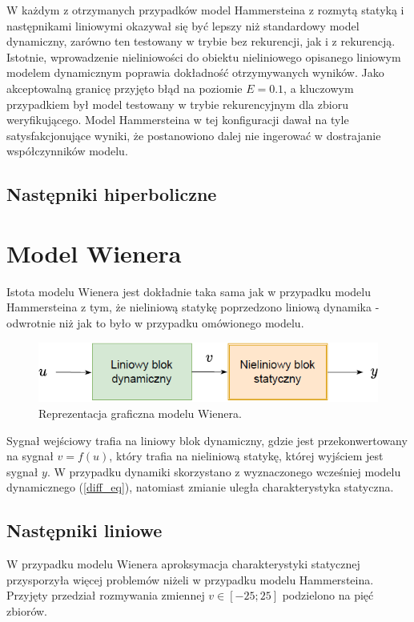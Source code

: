 \documentclass[a4paper,titlepage,11pt,floatssmall]{mwrep}
\begin{document}
W każdym z otrzymanych przypadków model Hammersteina z rozmytą statyką i następnikami liniowymi okazywał się być lepszy niż standardowy model dynamiczny, zarówno ten testowany w trybie bez rekurencji, jak i z rekurencją. Istotnie, wprowadzenie nieliniowości do obiektu nieliniowego opisanego liniowym modelem dynamicznym poprawia dokładność otrzymywanych wyników. Jako akceptowalną granicę przyjęto błąd na poziomie $E = \num{0.1}$, a kluczowym przypadkiem był model testowany w trybie rekurencyjnym dla zbioru weryfikującego. Model Hammersteina w tej konfiguracji dawał na tyle satysfakcjonujące wyniki, że postanowiono dalej nie ingerować w dostrajanie współczynników modelu. 

\newpage

\section{Następniki hiperboliczne}

\chapter{Model Wienera}
Istota modelu Wienera jest dokładnie taka sama jak w przypadku modelu Hammersteina z tym, że nieliniową statykę poprzedzono liniową dynamika - odwrotnie niż jak to było w przypadku omówionego modelu.

\begin{figure}[h!]
\centering
\includegraphics[width=\textwidth]{pictures/wien_model}
\caption{Reprezentacja graficzna modelu Wienera.}
\end{figure}

Sygnał wejściowy trafia na liniowy blok dynamiczny, gdzie jest przekonwertowany na sygnał $v = f(u)$, który trafia na nieliniową statykę, której wyjściem jest sygnał $y$. W przypadku dynamiki skorzystano z wyznaczonego wcześniej modelu dynamicznego (\ref{diff_eq}), natomiast zmianie uległa charakterystyka statyczna.

\section{Następniki liniowe}
W przypadku modelu Wienera aproksymacja charakterystyki statycznej przysporzyła więcej problemów niżeli w przypadku modelu Hammersteina. Przyjęty przedział rozmywania zmiennej $v \in [-25;25]$ podzielono na pięć zbiorów.
\end{document}
